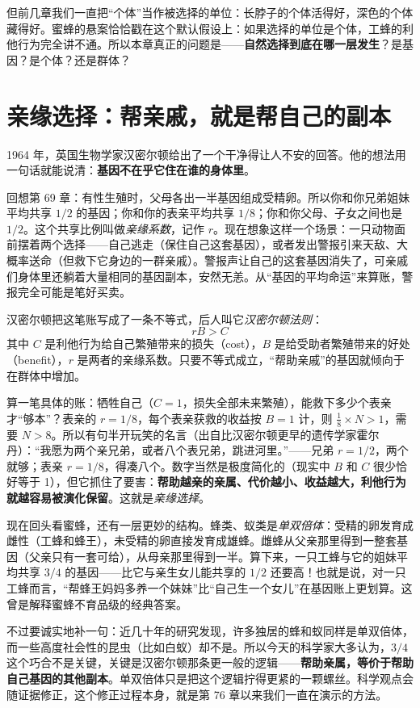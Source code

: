 但前几章我们一直把“个体”当作被选择的单位：长脖子的个体活得好，深色的个体藏得好。蜜蜂的悬案恰恰戳在这个默认假设上：如果选择的单位是个体，工蜂的利他行为完全讲不通。所以本章真正的问题是——\textbf{自然选择到底在哪一层发生}？是基因？是个体？还是群体？

\section{亲缘选择：帮亲戚，就是帮自己的副本}

1964 年，英国生物学家汉密尔顿给出了一个干净得让人不安的回答。他的想法用一句话就能说清：\textbf{基因不在乎它住在谁的身体里}。

回想第 69 章：有性生殖时，父母各出一半基因组成受精卵。所以你和你兄弟姐妹平均共享 $1/2$ 的基因；你和你的表亲平均共享 $1/8$；你和你父母、子女之间也是 $1/2$。这个共享比例叫做\emph{亲缘系数}，记作 $r$。现在想象这样一个场景：一只动物面前摆着两个选择——自己逃走（保住自己这套基因），或者发出警报引来天敌、大概率送命（但救下它身边的一群亲戚）。警报声让自己的这套基因消失了，可亲戚们身体里还躺着大量相同的基因副本，安然无恙。从“基因的平均命运”来算账，警报完全可能是笔好买卖。

\begin{qiaoliang}
汉密尔顿把这笔账写成了一条不等式，后人叫它\emph{汉密尔顿法则}：
\[
rB > C
\]
其中 $C$ 是利他行为给自己繁殖带来的损失（cost），$B$ 是给受助者繁殖带来的好处（benefit），$r$ 是两者的亲缘系数。只要不等式成立，“帮助亲戚”的基因就倾向于在群体中增加。

算一笔具体的账：牺牲自己（$C=1$，损失全部未来繁殖），能救下多少个表亲才“够本”？表亲的 $r=1/8$，每个表亲获救的收益按 $B=1$ 计，则 $\frac{1}{8} \times N > 1$，需要 $N>8$。所以有句半开玩笑的名言（出自比汉密尔顿更早的遗传学家霍尔丹）：“我愿为两个亲兄弟，或者八个表兄弟，跳进河里。”——兄弟 $r=1/2$，两个就够；表亲 $r=1/8$，得凑八个。数字当然是极度简化的（现实中 $B$ 和 $C$ 很少恰好等于 1），但它抓住了要害：\textbf{帮助越亲的亲属、代价越小、收益越大，利他行为就越容易被演化保留}。这就是\emph{亲缘选择}。
\end{qiaoliang}

现在回头看蜜蜂，还有一层更妙的结构。蜂类、蚁类是\emph{单双倍体}：受精的卵发育成雌性（工蜂和蜂王），未受精的卵直接发育成雄蜂。雌蜂从父亲那里得到一整套基因（父亲只有一套可给），从母亲那里得到一半。算下来，一只工蜂与它的姐妹平均共享 $3/4$ 的基因——比它与亲生女儿能共享的 $1/2$ 还要高！也就是说，对一只工蜂而言，“帮蜂王妈妈多养一个妹妹”比“自己生一个女儿”在基因账上更划算。这曾是解释蜜蜂不育品级的经典答案。

不过要诚实地补一句：近几十年的研究发现，许多独居的蜂和蚁同样是单双倍体，而一些高度社会性的昆虫（比如白蚁）却不是。所以今天的科学家大多认为，$3/4$ 这个巧合不是关键，关键是汉密尔顿那条更一般的逻辑——\textbf{帮助亲属，等价于帮助自己基因的其他副本}。单双倍体只是把这个逻辑拧得更紧的一颗螺丝。科学观点会随证据修正，这个修正过程本身，就是第 76 章以来我们一直在演示的方法。

